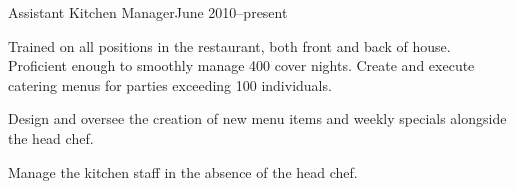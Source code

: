 \documentclass[10pt]{resume}
\begin{document}
\expblock
{Assistant Kitchen Manager}{June 2010--present}
{
    \item Trained on all positions in the restaurant, both front and back of
    house. Proficient enough to smoothly manage 400 cover nights. Create
    and execute catering menus for parties exceeding 100 individuals.
        

        

    \item Design and oversee the creation of new menu items and weekly
    specials alongside the head chef.

    \item Manage the kitchen staff in the absence of the head chef.
}
\end{document}

